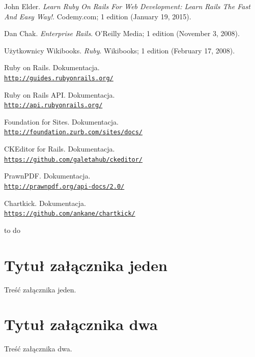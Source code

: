 \documentclass[openright]{xmgr}
\begin{document}
\begin{thebibliography}{9}
John Elder.
\textit{Learn Ruby On Rails For Web Development: Learn Rails The Fast And Easy Way!}. 
Codemy.com; 1 edition (January 19, 2015).
 
Dan Chak.
\textit{Enterprise Rails}. 
O'Reilly Media; 1 edition (November 3, 2008).

Użytkownicy Wikibooks.
\textit{Ruby}. 
Wikibooks; 1 edition (February 17, 2008).

Ruby on Rails. Dokumentacja.
\\\texttt{\url{http://guides.rubyonrails.org/}}

Ruby on Rails API. Dokumentacja.
\\\texttt{\url{http://api.rubyonrails.org/}}

Foundation for Sites. Dokumentacja.
\\\texttt{\url{http://foundation.zurb.com/sites/docs/}}

CKEditor for Rails. Dokumentacja.
\\\texttt{\url{https://github.com/galetahub/ckeditor/}}

PrawnPDF. Dokumentacja.
\\\texttt{\url{http://prawnpdf.org/api-docs/2.0/}}

Chartkick. Dokumentacja.
\\\texttt{\url{https://github.com/ankane/chartkick/}}
\end{thebibliography}


\summary
to do

\appendix
\chapter{Tytuł załącznika jeden}

Treść załącznika jeden.

\chapter{Tytuł załącznika dwa}

Treść załącznika dwa.



\listoftables

\listoffigures

\oswiadczenie
\end{document}
